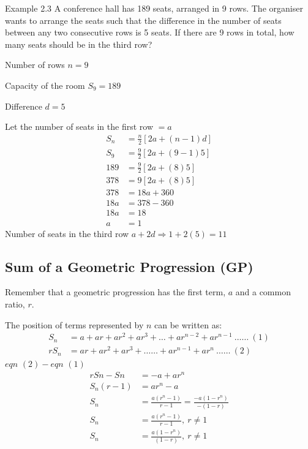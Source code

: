 \begin{example}{Example 2.3}
A conference hall has 189 seats, arranged in 9 rows. The organiser wants to
arrange the seats such that the difference in the number of seats between any two
consecutive rows is 5 seats. If there are 9 rows in total, how many seats should be
in the third row?

\solution
Number of rows $n = 9$

Capacity of the room $S_9 = 189$

Difference $d = 5$

Let the number of seats in the first row $= a$
\begin{align*}
  S_n &= \frac{n}{2}[2a + (n-1)d] \\
  S_9 &= \frac{9}{2}[2a + (9-1)5] \\
  189 &= \frac{9}{2}[2a + (8)5] \\
  378 &= 9[2a + (8)5] \\
  378 &= 18a + 360 \\
  18a &= 378 - 360 \\
  18a &= 18 \\
  a &= 1
\end{align*}
Number of seats in the third row $a + 2d \Rightarrow 1 + 2(5) = 11$
\end{example}

\subsection{Sum of a Geometric Progression (GP)}

Remember that a geometric progression has the first term, $a$ and a common ratio, $r$.

The position of terms represented by $n$ can be written as:
\begin{align*}
  S_n &= a + ar + ar^2 + ar^3 + \ldots + ar^{n-2} + ar^{n-1} \ \ldots\ldots\ (1) \\
  rS_n &= ar + ar^2 + ar^3 + \ldots\ldots + ar^{n-1} + ar^{n} \ \ldots\ldots\ (2)
\end{align*}
$\textit{eqn } (2) - \textit{eqn } (1)$
\begin{align*}
  rSn - Sn &= -a + ar^n \\
  S_n(r-1) &= ar^n - a \\
  S_n &= \frac{a(r^n - 1)}{r - 1} = \frac{-a(1 - r^n)}{-(1 - r)} \\
  S_n &= \frac{a(r^n - 1)}{r - 1},\ r \ne 1 \\
  S_n &= \frac{a(1 - r^n)}{(1 - r)},\ r \ne 1
\end{align*}


